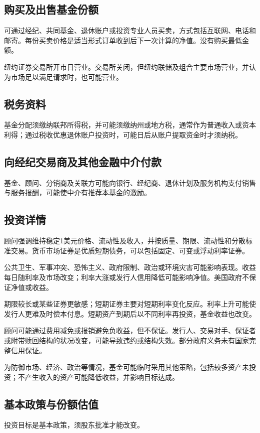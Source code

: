 \documentclass[UTF8,fontset=none,11pt,a4paper]{ctexart}
\begin{document}
\subsection*{购买及出售基金份额}
可通过经纪、共同基金、退休账户或投资专业人员买卖，方式包括互联网、电话和邮寄。每份买卖价格是适当形式订单收到后下一次计算的净值。没有购买最低金额。


纽约证券交易所开市日营业。交易所关闭，但纽约联储及组合主要市场营业，并认为市场足以满足请求时，也可能营业。


\subsection*{税务资料}
基金分配须缴纳联邦所得税，并可能须缴纳州或地方税，通常作为普通收入或资本利得；通过税收优惠退休账户投资时，可能日后从账户提取资金时才须纳税。


\subsection*{向经纪交易商及其他金融中介付款}
基金、顾问、分销商及关联方可能向银行、经纪商、退休计划及服务机构支付销售与服务报酬，可能使中介有推荐本基金的激励。


\subsection*{投资详情}
顾问强调维持稳定1美元价格、流动性及收入，并按质量、期限、流动性和分散标准交易。货币市场证券是优质短期债务，可以包括固定、可变或浮动利率证券。


公共卫生、军事冲突、恐怖主义、政府限制、政治或环境灾害可能影响表现。收益每日随利率及市场改变；利率大涨或发行人信用降低可能影响净值。美国政府不保证净值或收益。


期限较长或某些证券更敏感；短期证券主要对短期利率变化反应。利率上升可能使发行人更难及时偿本付息。短期资产到期后以不同利率再投资，基金收益也改变。


顾问可能通过费用减免或报销避免负收益，但不保证。发行人、交易对手、保证者或附带赎回结构的状况改变，可能导致违约或结构失效。部分政府义务未有国家完整信用保证。


为防御市场、经济、政治等情况，基金可能临时采用其他策略，包括较多资产未投资；不产生收入的资产可能降低收益，并影响目标达成。


\subsection*{基本政策与份额估值}
投资目标是基本政策，须股东批准才能改变。
\end{document}
